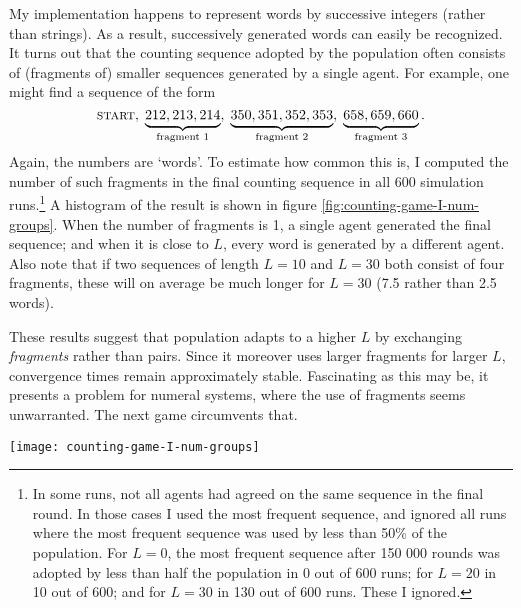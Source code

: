 \documentclass{../src/bcthesispart}
\begin{document}
My implementation happens to represent words by successive integers (rather than strings). 
As a result, successively generated words can easily be recognized. 
It turns out that the counting sequence adopted by the population often consists of (fragments of) smaller sequences generated by a single agent.
For example, one might find a sequence of the form
\[
	\textsc{start}, \;
	\underbrace{212, 213, 214}_{\text{fragment 1}}, \; 
	\underbrace{350, 351, 352, 353}_{\text{fragment 2}}, \;
	\underbrace{658, 659, 660}_{\text{fragment 3}}.
\]
Again, the numbers are ‘words’.
To estimate how common this is, I computed the number of such fragments in the final counting sequence in all 600 simulation runs.\footnote{
	In some runs, not all agents had agreed on the same sequence in the final round.
	In those cases I used the most frequent sequence, and ignored all runs where the most frequent sequence was used by less than 50\% of the population.%
	For $L=0$, the most frequent sequence after 150 000 rounds was adopted by less than half the population in 0 out of 600 runs; for $L=20$ in 10 out of 600; and for $L=30$ in 130 out of 600 runs. These I ignored.}
A histogram of the result is shown in figure \ref{fig:counting-game-I-num-groups}. %
When the number of fragments is 1, a single agent generated the final sequence; and when it is close to $L$, every word is generated by a different agent.
Also note that if two sequences of length $L=10$ and $L=30$ both consist of four fragments, these will on average be much longer for $L=30$ (7.5 rather than 2.5 words).

These results suggest that population adapts to a higher $L$ by exchanging \emph{fragments} rather than pairs.
Since it moreover uses larger fragments for larger $L$, convergence times remain approximately stable. 
Fascinating as this may be, it presents a problem for numeral systems, where the use of fragments seems unwarranted. 
The next game circumvents that.


\begin{SCfigure}
	\hspace{-1.25cm}
	\texttt{[image: counting-game-I-num-groups]}
	\caption{The number of ‘fragments’ in the final counting sequence across 600 simulation runs. Each fragment is a sequence of words successively generated by a single agent. 
		\label{fig:counting-game-I-num-groups}}
\end{SCfigure}

\end{document}

